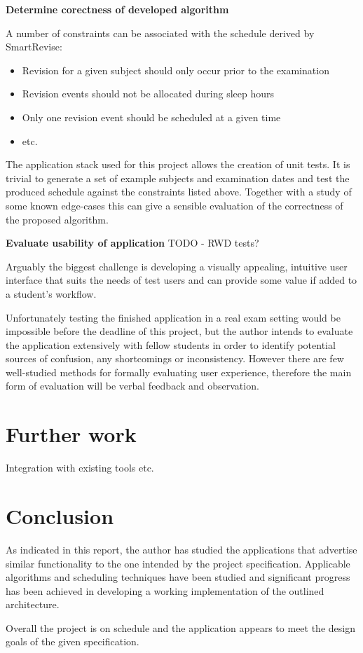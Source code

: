 \documentclass[bsc,frontabs,twoside,singlespacing,parskip]{infthesis}     %
\begin{document}
	\textbf{Determine corectness of developed algorithm}

	A number of constraints can be associated with the schedule derived by SmartRevise:

	\begin{itemize}
		\item Revision for a given subject should only occur prior to the examination
		\item Revision events should not be allocated during sleep hours
	  	\item Only one revision event should be scheduled at a given time
		\item etc.
	\end{itemize}

	The application stack used for this project allows the creation of unit tests. It is trivial to generate a set of example subjects and examination dates and test the produced schedule against the constraints listed above. Together with a study of some known edge-cases this can give a sensible evaluation of the correctness of the proposed algorithm.

	\textbf{Evaluate usability of application}
	TODO - RWD tests?

	Arguably the biggest challenge is developing a visually appealing, intuitive user interface that suits the needs of test users and can provide some value if added to a student's workflow.

	Unfortunately testing the finished application in a real exam setting would be impossible before the deadline of this project, but the author intends to evaluate the application extensively with fellow students in order to identify potential sources of confusion, any shortcomings or inconsistency. However there are few well-studied methods for formally evaluating user experience, therefore the main form of evaluation will be verbal feedback and observation.




\chapter{Further work}
	Integration with existing tools
	etc.



\chapter{Conclusion}

	As indicated in this report, the author has studied the applications that advertise similar functionality to the one intended by the project specification. Applicable algorithms and scheduling techniques have been studied and significant progress has been achieved in developing a working implementation of the outlined architecture.

	Overall the project is on schedule and the application appears to meet the design goals of the given specification.



%
%
\end{document}
